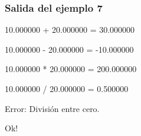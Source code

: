 \subsubsection{Salida del ejemplo 7}
10.000000 + 20.000000 = 30.000000\par
10.000000 - 20.000000 = -10.000000\par
10.000000 * 20.000000 = 200.000000\par
10.000000 / 20.000000 = 0.500000\par
\vspace{1ex}
Error: División entre cero.\par
\vspace{1ex}
Ok!\par




  

